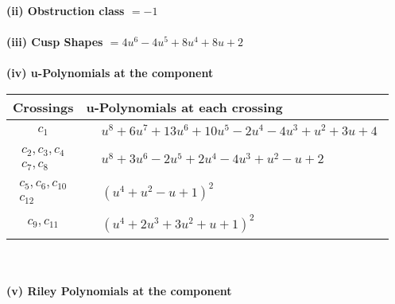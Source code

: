 \documentclass[1p]{elsarticle_modified}
\theoremstyle{definition}
\begin{document}
\flushleft \textbf{(ii) Obstruction class $= -1$}\\~\\
\flushleft \textbf{(iii) Cusp Shapes $= 4 u^6-4 u^5+8 u^4+8 u+2$}\\~\\
\newpage\renewcommand{\arraystretch}{1}
\flushleft \textbf{(iv) u-Polynomials at the component}\newline \\
\begin{tabular}{m{50pt}|m{274pt}}
Crossings & \hspace{64pt}u-Polynomials at each crossing \\
\hline $$\begin{aligned}c_{1}\end{aligned}$$&$\begin{aligned}
&u^8+6 u^7+13 u^6+10 u^5-2 u^4-4 u^3+u^2+3 u+4
\end{aligned}$\\
\hline $$\begin{aligned}c_{2},c_{3},c_{4}\\c_{7},c_{8}\end{aligned}$$&$\begin{aligned}
&u^8+3 u^6-2 u^5+2 u^4-4 u^3+u^2- u+2
\end{aligned}$\\
\hline $$\begin{aligned}c_{5},c_{6},c_{10}\\c_{12}\end{aligned}$$&$\begin{aligned}
&(u^4+u^2- u+1)^2
\end{aligned}$\\
\hline $$\begin{aligned}c_{9},c_{11}\end{aligned}$$&$\begin{aligned}
&(u^4+2 u^3+3 u^2+u+1)^2
\end{aligned}$\\
\hline
\end{tabular}\\~\\
\newpage\renewcommand{\arraystretch}{1}
\flushleft \textbf{(v) Riley Polynomials at the component}\newline \\
\end{document}
